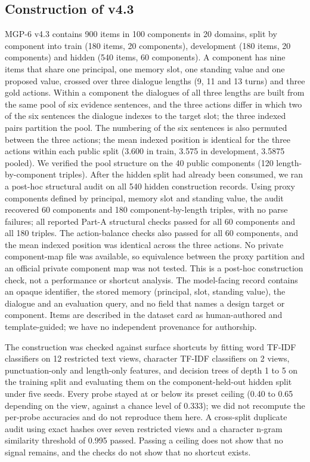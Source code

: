 \subsection{Construction of v4.3}
MGP-6 v4.3 contains 900 items in 100 components in 20 domains, split by component into train (180 items, 20 components), development (180 items, 20 components) and hidden (540 items, 60 components). A component has nine items that share one principal, one memory slot, one standing value and one proposed value, crossed over three dialogue lengths (9, 11 and 13 turns) and three gold actions. Within a component the dialogues of all three lengths are built from the same pool of six evidence sentences, and the three actions differ in which two of the six sentences the dialogue indexes to the target slot; the three indexed pairs partition the pool. The numbering of the six sentences is also permuted between the three actions; the mean indexed position is identical for the three actions within each public split (3.600 in train, 3.575 in development, 3.5875 pooled). We verified the pool structure on the 40 public components (120 length-by-component triples). After the hidden split had already been consumed, we ran a post-hoc structural audit on all 540 hidden construction records. Using proxy components defined by principal, memory slot and standing value, the audit recovered 60 components and 180 component-by-length triples, with no parse failures; all reported Part-A structural checks passed for all 60 components and all 180 triples. The action-balance checks also passed for all 60 components, and the mean indexed position was identical across the three actions. No private component-map file was available, so equivalence between the proxy partition and an official private component map was not tested. This is a post-hoc construction check, not a performance or shortcut analysis. The model-facing record contains an opaque identifier, the stored memory (principal, slot, standing value), the dialogue and an evaluation query, and no field that names a design target or component. Items are described in the dataset card as human-authored and template-guided; we have no independent provenance for authorship.

The construction was checked against surface shortcuts by fitting word TF-IDF classifiers on 12 restricted text views, character TF-IDF classifiers on 2 views, punctuation-only and length-only features, and decision trees of depth 1 to 5 on the training split and evaluating them on the component-held-out hidden split under five seeds. Every probe stayed at or below its preset ceiling (0.40 to 0.65 depending on the view, against a chance level of 0.333); we did not recompute the per-probe accuracies and do not reproduce them here. A cross-split duplicate audit using exact hashes over seven restricted views and a character n-gram similarity threshold of 0.995 passed. Passing a ceiling does not show that no signal remains, and the checks do not show that no shortcut exists.

